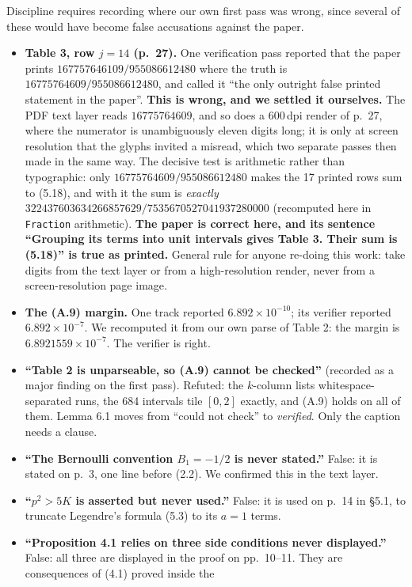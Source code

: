 \documentclass[11pt]{article}
\theoremstyle{definition}
\begin{document}
Discipline requires recording where our own first pass was wrong, since several of these would
have become false accusations against the paper.

\begin{itemize}
\item \textbf{Table 3, row $j=14$ (p.~27).} One verification pass reported that the paper prints
$167757646109/955086612480$ where the truth is $16775764609/955086612480$, and called it ``the
only outright false printed statement in the paper''. \textbf{This is wrong, and we settled it
ourselves.} The PDF text layer reads $16775764609$, and so does a 600\,dpi render of p.~27,
where the numerator is unambiguously eleven digits long; it is only at screen resolution that
the glyphs invited a misread, which two separate passes then made in the same way. The decisive
test is arithmetic rather than typographic: only $16775764609/955086612480$ makes the 17 printed
rows sum to (5.18), and with it the sum is \emph{exactly}
$322437603634266857629/7535670527041937280000$ (recomputed here in \texttt{Fraction}
arithmetic). \textbf{The paper is correct here, and its sentence ``Grouping its terms into unit
intervals gives Table 3. Their sum is (5.18)'' is true as printed.} General rule for anyone
re-doing this work: take digits from the text layer or from a high-resolution render, never from
a screen-resolution page image.
\item \textbf{The (A.9) margin.} One track reported $6.892\times10^{-10}$; its verifier reported
$6.892\times10^{-7}$. We recomputed it from our own parse of Table 2: the margin is
$6.8921559\times10^{-7}$. The verifier is right.
\item \textbf{``Table 2 is unparseable, so (A.9) cannot be checked''} (recorded as a major
finding on the first pass). Refuted: the $k$-column lists whitespace-separated runs, the 684
intervals tile $[0,2]$ exactly, and (A.9) holds on all of them. Lemma 6.1 moves from ``could not
check'' to \emph{verified}. Only the caption needs a clause.
\item \textbf{``The Bernoulli convention $B_1=-1/2$ is never stated.''} False: it is stated on
p.~3, one line before (2.2). We confirmed this in the text layer.
\item \textbf{``$p^2>5K$ is asserted but never used.''} False: it is used on p.~14 in \S5.1, to
truncate Legendre's formula (5.3) to its $a=1$ terms.
\item \textbf{``Proposition 4.1 relies on three side conditions never displayed.''} False: all
three are displayed in the proof on pp.~10--11. They are consequences of (4.1) proved inside the

\end{itemize}
\end{document}
